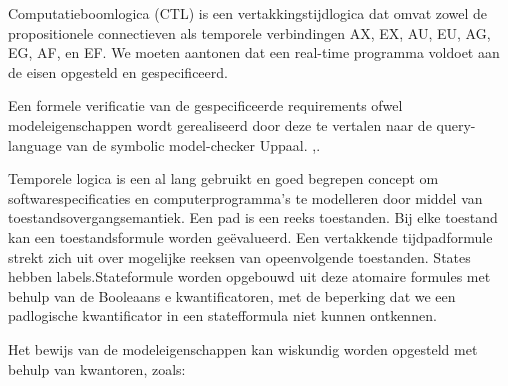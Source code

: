 \documentclass{article}
\begin{document}
	Computatieboomlogica (CTL) is een vertakkingstijdlogica
	dat omvat zowel de propositionele connectieven als
	temporele verbindingen AX, EX, AU, EU, AG, EG, AF,
	en EF.
	We moeten aantonen dat een real-time programma voldoet aan de eisen opgesteld en gespecificeerd. 
	
	Een formele verificatie van de gespecificeerde requirements ofwel modeleigenschappen wordt gerealiseerd door deze te vertalen naar de query-language van de symbolic model-checker Uppaal.  \cite{alurSystemClok},\cite{alurModelHybrid}.
	
	Temporele logica is een al lang gebruikt en goed begrepen concept om softwarespecificaties en computerprogramma's te modelleren door middel van toestandsovergangsemantiek.
	Een pad is een reeks toestanden. Bij elke toestand kan een toestandsformule worden geëvalueerd. Een vertakkende tijdpadformule strekt zich uit over mogelijke reeksen van opeenvolgende toestanden.
	States hebben labels.Stateformule worden opgebouwd uit deze atomaire formules met behulp van de Booleaans e kwantificatoren, met de beperking dat we een padlogische kwantificator in een statefformula niet kunnen ontkennen.  
	
	
	
	
	
	Het bewijs van de modeleigenschappen kan wiskundig worden opgesteld met behulp van kwantoren, zoals:
	
	
	
\end{document}
